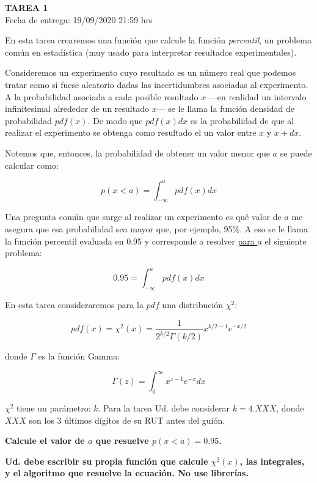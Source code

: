 \documentclass[letter, 11pt]{article}
\newcommand{\tareanro}{1}
\newcommand{\fechaentrega}{19/09/2020 21:59 hrs}
\begin{document}
\thispagestyle{firstpage}

\begin{center}
  {\uppercase{\LARGE \bf Tarea \tareanro}}\\
  Fecha de entrega: \fechaentrega
\end{center}



En esta tarea crearemos una función que calcule la función {\it percentil},
un problema común en estadística (muy usado para interpretar resultados
experimentales).

Consideremos un experimento cuyo resultado es un número real que podemos tratar
como si fuese aleatorio dadas las incertidumbres asociadas al experimento. A la
probabilidad asociada a cada posible resultado $x$ ---en realidad un intervalo
infinitesimal alrededor de un resultado $x$--- se le llama la función densidad
de probabilidad $pdf(x)$. De modo que $pdf(x) dx$ es la probabilidad de que al
realizar el experimento se obtenga como resultado el un valor entre $x$ y
$x+dx$.

Notemos que, entonces, la probabilidad de obtener un valor menor que $a$ se
puede calcular como:

$$p(x<a) = \int_{-\infty}^{a} pdf(x) dx $$

Una pregunta común que surge al realizar un experimento es qué valor de $a$ me
asegura que esa probabilidad sea mayor que, por ejemplo, 95\%. A eso se le
llama la función percentil evaluada en 0.95 y corresponde a resolver
\underline{para $a$} el siguiente problema:

$$ 0.95 = \int_{-\infty}^{a} pdf(x) dx $$

En esta tarea consideraremos para la $pdf$ una distribución $\chi^2$:

$$ pdf(x) = \chi^2(x) = \frac{1}{2^{k/2}\Gamma(k/2)} x^{k/2-1} e^{-x/2} $$

donde $\Gamma$ es la función Gamma:

$$ \Gamma(z) = \int_0^{\infty} x^{z-1}e^{-x}dx $$

$\chi^2$ tiene un parámetro: $k$. Para la tarea Ud. debe considerar $k=4.XXX$,
donde $XXX$ son los 3 últimos dígitos de su RUT antes del guión.

{\bf Calcule el valor de $a$ que resuelve $p(x<a) = 0.95$.}

{\bf Ud. debe escribir su propia función que calcule $\chi^2(x)$, las integrales, y
el algoritmo que resuelve la ecuación. No use librerías.}
\end{document}
